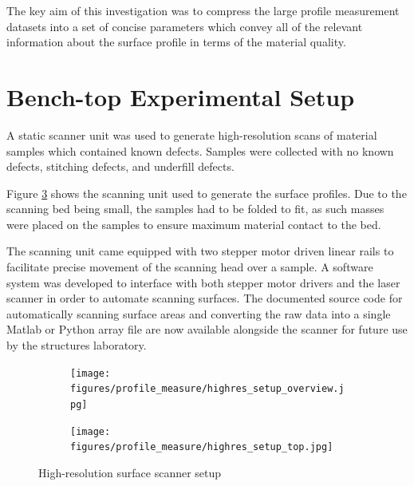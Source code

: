 \documentclass[12pt]{report}
\begin{document}
The key aim of this investigation was to compress the large profile measurement datasets into a set of concise parameters which convey all of the relevant information about the surface profile in terms of the material quality.

\section{Bench-top Experimental Setup}

A static scanner unit was used to generate high-resolution scans of material samples which contained known defects. Samples were collected with no known defects, stitching defects, and underfill defects.

Figure \ref{fig:highres_setup} shows the scanning unit used to generate the surface profiles. Due to the scanning bed being small, the samples had to be folded to fit, as such masses were placed on the samples to ensure maximum material contact to the bed. 

The scanning unit came equipped with two stepper motor driven linear rails to facilitate precise movement of the scanning head over a sample. A software system was developed to interface with both stepper motor drivers and the laser scanner in order to automate scanning surfaces. The documented source code for automatically scanning surface areas and converting the raw data into a single Matlab or Python array file are now available alongside the scanner for future use by the structures laboratory.

\begin{figure}[h!]
    \begin{subfigure}{0.5\textwidth}
        \centering
        \texttt{[image: figures/profile\_measure/highres\_setup\_overview.jpg]}  
        \label{fig:highres_setup_front}
    \end{subfigure}
    \begin{subfigure}{0.5\textwidth}
        \centering
        \texttt{[image: figures/profile\_measure/highres\_setup\_top.jpg]}  
        \label{fig:highres_setup_top}
    \end{subfigure}
    \caption{High-resolution surface scanner setup}
    \label{fig:highres_setup}
\end{figure}
\end{document}

